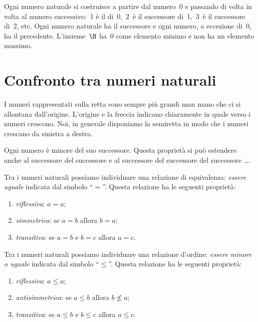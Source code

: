 {\natrappgeo}

\vspace{-.5em}
Ogni numero naturale si costruisce a partire dal numero~0 e passando di 
volta in volta al numero successivo:~1 è il  di~0,~2~è il 
successore di~1,~3~è il successore di~2, etc. 
Ogni numero naturale ha il successore e ogni numero, a eccezione 
di~0, ha il
precedente. 
L'insieme~\(\N\) ha~0 come elemento 
minimo e non ha un elemento 
massimo.


\section{Confronto tra numeri naturali}
\label{sec:nat_confronto}

I numeri rappresentati sulla retta sono sempre più grandi man mano che ci 
si allontana dall'origine. 
L'origine e la freccia indicano chiaramente in quale verso i numeri 
crescono. Noi, in generale disponiamo la semiretta in modo che i numeri 
crescano da sinistra a destra.

Ogni numero è minore del suo successore.
Questa proprietà si può estendere anche al successore del successore e 
al successore del successore del successore \dots. 

Tra i numeri naturali possiamo individuare una relazione di 
equivalenza: 
\emph{essere uguale} indicata dal simbolo ``\(=\)''. 
Questa relazione ha le seguenti proprietà:
\begin{enumerate} [nosep]
\item \emph{riflessiva}: \(a = a\);
\item \emph{simmetrica}: se \(a = b\) allora 
\(b = a\);
\item \emph{transitiva}: se \(a = b\) e \(b = c\) allora 
\(a = c\).
\end{enumerate}

Tra i numeri naturali possiamo individuare una relazione d'ordine: 
\emph{essere minore o uguale} indicata dal simbolo ``\(\leqslant\)''. 
Questa relazione ha le seguenti proprietà:
\begin{enumerate} [nosep]
\item \emph{riflessiva}: \(a \leqslant a\);
\item \emph{antisimmetrica}: se \(a \leqslant b\) allora 
\(b \nleqslant a\);
\item \emph{transitiva}: se \(a \leqslant b\) e \(b \leqslant c\) 
allora \(a \leqslant c\).
\end{enumerate}

